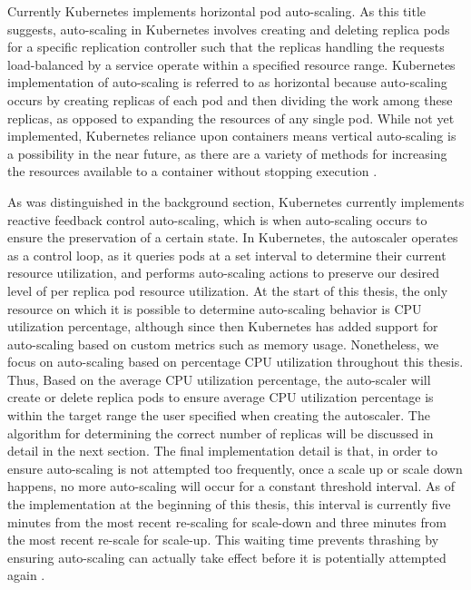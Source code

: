 Currently Kubernetes implements horizontal pod auto-scaling.
As this title suggests, auto-scaling in
Kubernetes involves creating and deleting replica pods for a specific replication
controller such that the replicas handling the requests load-balanced by a service
operate within a specified resource range. Kubernetes
implementation of auto-scaling is referred to as horizontal because
auto-scaling occurs by creating replicas of each pod and then dividing the work
among these replicas, as opposed to expanding the resources of any single pod.
While not yet implemented, Kubernetes reliance upon containers means vertical
auto-scaling is a possibility in the near future, as there are a variety of
methods for increasing the resources available to a container without stopping
execution \cite{docker-up-and-running}.

As was distinguished in the background section, Kubernetes currently implements reactive
feedback control auto-scaling, which is when auto-scaling occurs to
ensure the preservation of a certain state.
In Kubernetes, the autoscaler operates as a control loop,
as it queries pods at a set interval to determine
their current resource utilization, and performs auto-scaling actions to
preserve our desired level of per replica pod resource utilization.
At the start of this thesis, the only resource on which it is possible to
determine auto-scaling behavior is CPU utilization percentage, although since
then Kubernetes has added support for auto-scaling based on custom metrics such
as memory usage. Nonetheless, we focus on auto-scaling based on percentage CPU
utilization throughout this thesis.
Thus, Based on the average CPU utilization percentage, the
auto-scaler will create or delete replica pods to ensure average CPU utilization
percentage is within the target range the user specified when creating the
autoscaler. The algorithm for determining the correct number of replicas
will be discussed in detail in the next section. The final implementation detail
is that, in order to ensure auto-scaling is not attempted too frequently, once a
scale up or scale down happens, no more auto-scaling will occur for a constant
threshold interval. As of the implementation at the beginning of this thesis,
this interval is currently five minutes from the most recent
re-scaling for scale-down and three minutes from the most recent re-scale for
scale-up. This waiting time prevents thrashing by ensuring
auto-scaling can actually take effect before it is potentially attempted again
\cite{k8s-horizontal-pod-autoscaler-user-guide}.
